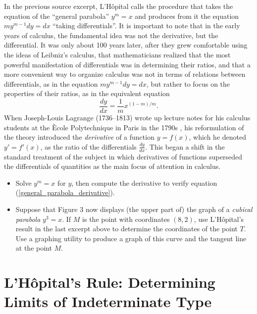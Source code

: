 \documentclass[11pt]{article}
\newcounter{tasknumb}
\newcommand{\tasknumb}[1]{\refstepcounter{tasknumb}\textmd{\textbf{$\fbox{$\fbox{Task \thetasknumb}$}$}}#1}
\newenvironment{task}[1][]%
 {\begin{itemize}
 \item[\tasknumb{#1}] }
{
    \end{itemize}    }%
\begin{document}
\bigskip
In the previous source excerpt, L'H\^opital calls the procedure that takes the equation of the ``general parabola'' $y^m=x$ and produces from it the equation $my^{m-1}dy=dx$ ``taking differentials''. It is important to note that in the early years of calculus, the fundamental idea was not the derivative, but the differential. It was only about 100 years later, after they grew comfortable using the ideas of Leibniz's calculus, that mathematicians realized that the most powerful manifestation of differentials was in determining their ratios, and that a more convenient way to organize calculus was not in terms of relations between differentials, as in the equation $my^{m-1}dy=dx$, but rather to focus on the properties of their ratios, as in the equivalent equation 
\begin{equation}\label{general_parabola_derivative}
\frac{dy}{dx}=\frac{1}{m}x^{(1-m)/m}.
\end{equation}
When Joseph-Louis Lagrange (1736--1813) wrote up lecture notes for his calculus students at the \`Ecole Polytechnique in Paris in the 1790s \citep{Lagrange}, his reformulation of the theory introduced the \emph{derivative} of a function $y=f(x)$, which he denoted $y'=f'(x)$, as the ratio of the differentials $\frac{dy}{dx}$. This began a shift in the standard treatment of the subject in which derivatives of functions superseded the differentials of quantities as the main focus of attention in calculus.

\bigskip
\begin{task}[\label{general_parabola}]
Solve $y^m=x$ for $y$, then compute the derivative to verify equation (\ref{general_parabola_derivative}).
 \end{task}

\bigskip
\begin{task}[\label{cubical_parabola}]
Suppose that Figure 3 now displays (the upper part of) the graph of a \emph{cubical parabola} $y^3=x$. If $M$ is the point with coordinates $(8,2)$, use L'H\^opital's result in the last excerpt above to determine the coordinates of the point $T$. Use a graphing utility to produce a graph of this curve and the tangent line at the point $M$.
 \end{task}

\bigskip
\section{L'H\^opital's Rule: Determining Limits of Indeterminate Type} 
\end{document}

